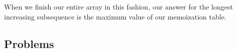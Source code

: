 When we finish our entire array in this fashion, our answer for the longest increasing subsequence is the maximum value of our memoization table.


\subsection{Problems}



\hrulefill



\hrulefill